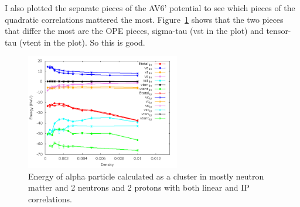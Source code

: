 \documentclass[12pt]{article}
\begin{document}
I also plotted the separate pieces of the AV6' potential to see which pieces of the quadratic correlations mattered the most. Figure~\ref{fig:av6_alpha_linVSip} shows that the two pieces that differ the most are the OPE pieces, sigma-tau (vst in the plot) and tensor-tau (vtent in the plot). So this is good.
\begin{figure}[h!]
   \centering
   \includegraphics[width=0.60\textwidth]{../../av6_alpha_linVSip.png}
   \caption{Energy of alpha particle calculated as a cluster in mostly neutron matter and 2 neutrons and 2 protons with both linear and IP correlations.}
   \label{fig:av6_alpha_linVSip}
\end{figure}
\end{document}
